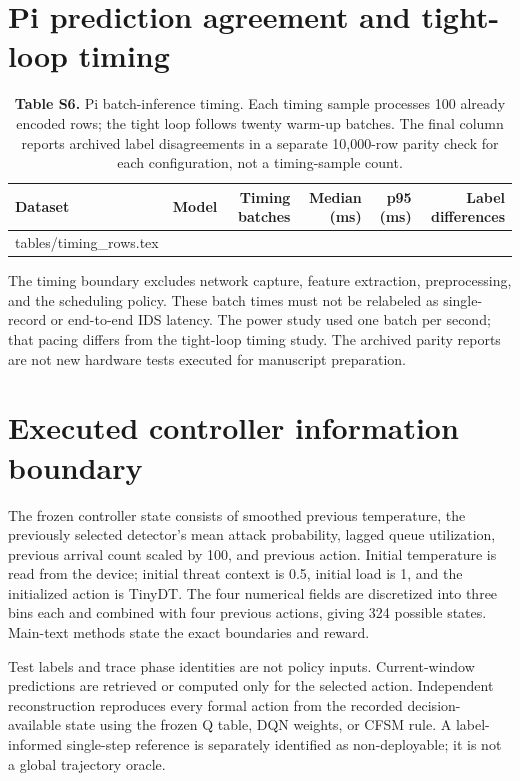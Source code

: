 \documentclass[10pt,a4paper]{article}
\makeatletter
\newcommand{\tableinput}[1]{\@@input #1.tex }
\makeatother
\begin{document}
\clearpage
\section{Pi prediction agreement and tight-loop timing}
\begin{table}[h!]
\centering\small
\caption*{\textbf{Table S6.} Pi batch-inference timing. Each timing sample processes 100 already encoded rows; the tight loop follows twenty warm-up batches. The final column reports archived label disagreements in a separate 10,000-row parity check for each configuration, not a timing-sample count.}
\begin{tabular}{llrrrr}\toprule
Dataset & Model & Timing batches & Median (ms) & p95 (ms) & Label differences\\\midrule
\tableinput{tables/timing_rows}
\bottomrule\end{tabular}
\end{table}
The timing boundary excludes network capture, feature extraction, preprocessing, and the scheduling policy. These batch times must not be relabeled as single-record or end-to-end IDS latency. The power study used one batch per second; that pacing differs from the tight-loop timing study. The archived parity reports are not new hardware tests executed for manuscript preparation.

\section{Executed controller information boundary}
The frozen controller state consists of smoothed previous temperature, the previously selected detector's mean attack probability, lagged queue utilization, previous arrival count scaled by 100, and previous action. Initial temperature is read from the device; initial threat context is 0.5, initial load is 1, and the initialized action is TinyDT. The four numerical fields are discretized into three bins each and combined with four previous actions, giving 324 possible states. Main-text methods state the exact boundaries and reward.

Test labels and trace phase identities are not policy inputs. Current-window predictions are retrieved or computed only for the selected action. Independent reconstruction reproduces every formal action from the recorded decision-available state using the frozen Q table, DQN weights, or CFSM rule. A label-informed single-step reference is separately identified as non-deployable; it is not a global trajectory oracle.
\end{document}

